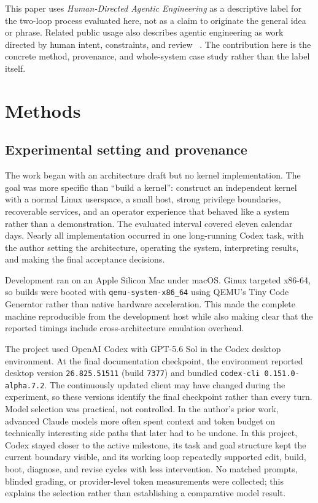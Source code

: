 \documentclass[11pt]{article}
\newcommand{\modelname}{OpenAI Codex with GPT-5.6 Sol}
\begin{document}
This paper uses \emph{Human-Directed Agentic Engineering} as a descriptive
label for the two-loop process evaluated here, not as a claim to originate the
general idea or phrase. Related public usage also describes agentic engineering
as work directed by human intent, constraints, and review
~\cite{niftHDAE2026,agentbubbleHDAE2026}. The contribution here is the concrete
method, provenance, and whole-system case study rather than the label itself.

\section{Methods}
\label{sec:methods}

\subsection{Experimental setting and provenance}

The work began with an architecture draft but no kernel implementation. The
goal was more specific than ``build a kernel'': construct an independent kernel
with a normal Linux userspace, a small host, strong privilege boundaries,
recoverable services, and an operator experience that behaved like a system
rather than a demonstration. The evaluated interval covered eleven calendar
days. Nearly all implementation occurred in one long-running Codex task, with
the author setting the architecture, operating the system, interpreting
results, and making the final acceptance decisions.

Development ran on an Apple Silicon Mac under macOS. Ginux targeted x86-64, so
builds were booted with \texttt{qemu-system-x86\_64} using QEMU's Tiny Code
Generator rather than native hardware acceleration. This made the complete
machine reproducible from the development host while also making clear that the
reported timings include cross-architecture emulation overhead.

The project used \modelname{} in the Codex desktop environment. At the final
documentation checkpoint, the environment reported desktop version
\texttt{26.825.51511} (build \texttt{7377}) and bundled
\texttt{codex-cli 0.151.0-alpha.7.2}. The continuously updated client may have
changed during the experiment, so these versions identify the final checkpoint
rather than every turn. Model selection was practical, not controlled. In the
author's prior work, advanced Claude models more often spent context and token
budget on technically interesting side paths that later had to be undone. In
this project, Codex stayed closer to the active milestone, its task and goal
structure kept the current boundary visible, and its working loop repeatedly
supported edit, build, boot, diagnose, and revise cycles with less intervention.
No matched prompts, blinded grading, or provider-level token measurements were
collected; this explains the selection rather than establishing a comparative
model result.
\end{document}
